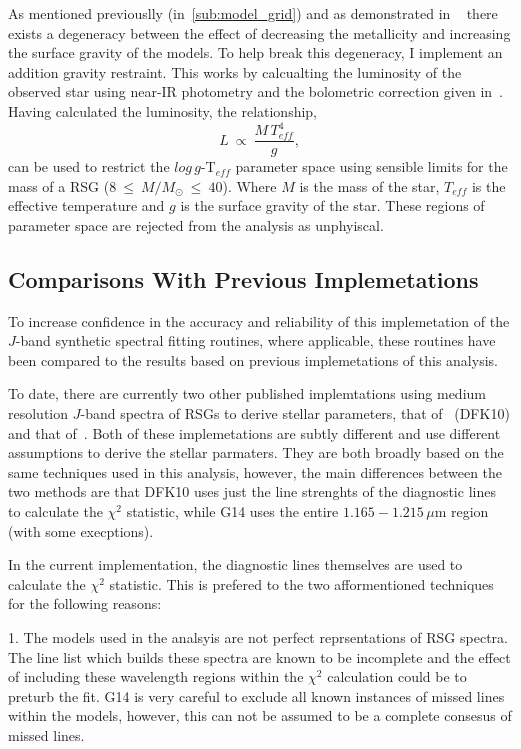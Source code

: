 \documentclass[12pt]{article}
\begin{document}
As mentioned previouslly (in~\ref{sub:model_grid}) and as demonstrated in
~\cite{2015ApJ...806...21D} there exists a degeneracy between the effect of decreasing the metallicity and increasing the surface gravity of the models.
To help break this degeneracy, I implement an addition gravity restraint.
This works by calcualting the luminosity of the observed star using near-IR photometry and the bolometric correction given in~\cite{Davies13b}.
Having calculated the luminosity, the relationship,
\begin{equation}
    L~\propto~\frac{M\,T^{4}_{eff}}{g},
\end{equation}
can be used to restrict the $log\,g$-T$_{eff}$
parameter space using sensible limits for the mass of a RSG
($8~\leq~M/M_{\odot}~\leq~40$).
Where $M$ is the mass of the star,
$T_{eff}$ is the effective temperature and $g$ is the surface gravity of the star.
These regions of parameter space are rejected from the analysis as unphyiscal.


\subsection{Comparisons With Previous Implemetations} %
\label{sub:compare}
To increase confidence in the accuracy and reliability of this implemetation of the $J$-band synthetic spectral fitting routines,
where applicable, these routines have been compared to the results based on previous implemetations of this analysis.

To date, there are currently two other published implemtations using medium resolution $J$-band spectra of RSGs to derive stellar parameters,
that of~\cite{2010MNRAS.407.1203D} (DFK10) and that of~\cite{2014PhDT.........G}.
Both of these implemetations are subtly different and use different assumptions to derive the stellar parmaters.
They are both broadly based on the same techniques used in this analysis,
however, the main differences between the two methods are that DFK10 uses just the line strenghts of the diagnostic lines to calculate the $\chi^{2}$ statistic,
while G14 uses the entire $1.165-1.215\,\mu$m region (with some execptions).

In the current implementation, the diagnostic lines themselves are used to calculate the $\chi^{2}$ statistic.
This is prefered to the two afformentioned techniques for the following reasons:

1. The models used in the analsyis are not perfect reprsentations of RSG spectra.
The line list which builds these spectra are known to be incomplete and the effect of including these wavelength regions within the $\chi^{2}$ calculation could be to preturb the fit. G14 is very careful to exclude all known instances of missed lines within the models, however, this can not be assumed to be a complete consesus of missed lines.
\end{document}
